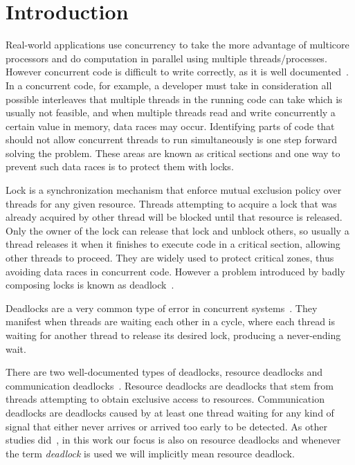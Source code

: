 \section{Introduction}

Real-world applications use concurrency to take the more advantage of multicore processors and do computation in parallel using multiple threads/processes.
However concurrent code is difficult to write correctly, as it is well documented~\cite{lu}.
In a concurrent code, for example, a developer must take in consideration all possible interleaves that multiple threads in the running code can take which is usually not feasible, and when multiple threads read and write concurrently a certain value in memory, data races may occur.
Identifying parts of code that should not allow concurrent threads to run simultaneously is one step forward solving the problem.
These areas are known as critical sections and one way to prevent such data races is to protect them with locks.

Lock is a synchronization mechanism that enforce mutual exclusion policy over threads for any given resource.
Threads attempting to acquire a lock that was already acquired by other thread will be blocked until that resource is released. 
Only the owner of the lock can release that lock and unblock others, so usually a thread releases it when it finishes to execute code in a critical section, allowing other threads to proceed.
They are widely used to protect critical zones, thus avoiding data races in concurrent code.
However a problem introduced by badly composing locks is known as deadlock~\cite{pyla}.

Deadlocks are a very common type of error in concurrent systems~\cite{lu}.
They manifest when threads are waiting each other in a cycle, where each thread is waiting for another thread to release its desired lock, producing a never-ending wait.

There are two well-documented types of deadlocks, resource deadlocks and communication deadlocks~\cite{singhal}\cite{knapp}.
Resource deadlocks are deadlocks that stem from threads attempting to obtain exclusive access to resources.
Communication deadlocks are deadlocks caused by at least one thread waiting for any kind of signal that either never arrives or arrived too early to be detected.
As other studies did~\cite{mcsdk}\cite{magicfuzzer}, in this work our focus is also on resource deadlocks and whenever the term \emph{deadlock} is used we will implicitly mean resource deadlock.

